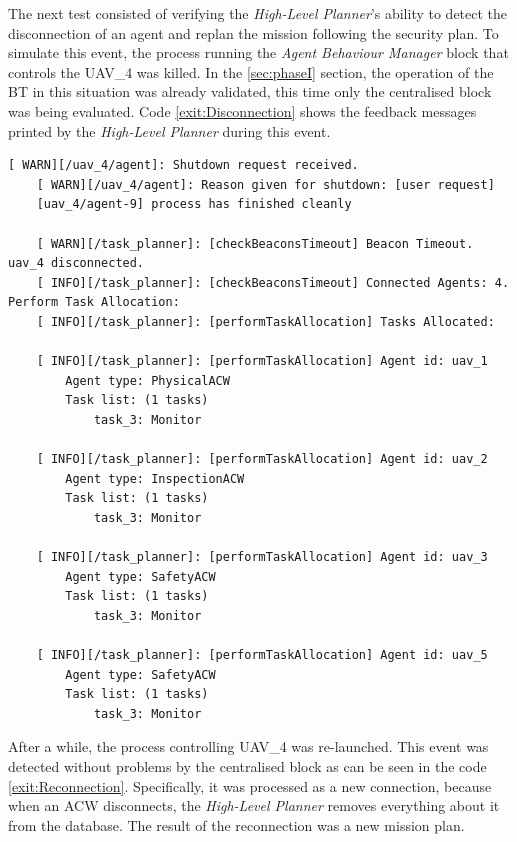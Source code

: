 The next test consisted of verifying the \emph{High-Level Planner}'s ability to detect the disconnection of an agent and replan the mission following the security plan. To simulate this event, the process running the \emph{Agent Behaviour Manager} block that controls the UAV\_4 was killed. In the \ref{sec:phaseI} section, the operation of the \gls{BT} in this situation was already validated, this time only the centralised block was being evaluated.  Code \ref{exit:Disconnection} shows the feedback messages printed by the \emph{High-Level Planner} during this event.

\begin{lstlisting}[caption={Feedback messages printed after an \gls{ACW} disconnects}, breaklines=true, label=exit:Disconnection]
    [ WARN][/uav_4/agent]: Shutdown request received.
    [ WARN][/uav_4/agent]: Reason given for shutdown: [user request]
    [uav_4/agent-9] process has finished cleanly
    
    [ WARN][/task_planner]: [checkBeaconsTimeout] Beacon Timeout. uav_4 disconnected.
    [ INFO][/task_planner]: [checkBeaconsTimeout] Connected Agents: 4. Perform Task Allocation:
    [ INFO][/task_planner]: [performTaskAllocation] Tasks Allocated:
    
    [ INFO][/task_planner]: [performTaskAllocation] Agent id: uav_1
        Agent type: PhysicalACW
        Task list: (1 tasks)
            task_3: Monitor
    
    [ INFO][/task_planner]: [performTaskAllocation] Agent id: uav_2
        Agent type: InspectionACW
        Task list: (1 tasks)
            task_3: Monitor
    
    [ INFO][/task_planner]: [performTaskAllocation] Agent id: uav_3
        Agent type: SafetyACW
        Task list: (1 tasks)
            task_3: Monitor
    
    [ INFO][/task_planner]: [performTaskAllocation] Agent id: uav_5
        Agent type: SafetyACW
        Task list: (1 tasks)
            task_3: Monitor
\end{lstlisting}

After a while, the process controlling UAV\_4 was re-launched. This event was detected without problems by the centralised block as can be seen in the code \ref{exit:Reconnection}. Specifically, it was processed as a new connection, because when an \gls{ACW} disconnects, the \emph{High-Level Planner} removes everything about it from the database. The result of the reconnection was a new mission plan.

